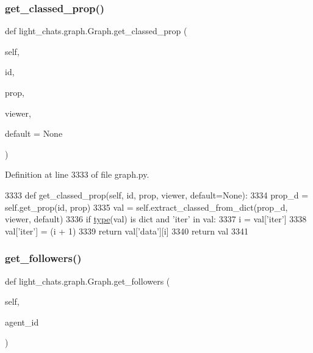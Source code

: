 \subsubsection{\texorpdfstring{get\+\_\+classed\+\_\+prop()}{get\_classed\_prop()}}
{\footnotesize\ttfamily def light\+\_\+chats.\+graph.\+Graph.\+get\+\_\+classed\+\_\+prop (\begin{DoxyParamCaption}\item[{}]{self,  }\item[{}]{id,  }\item[{}]{prop,  }\item[{}]{viewer,  }\item[{}]{default = {\ttfamily None} }\end{DoxyParamCaption})}



Definition at line 3333 of file graph.\+py.


\begin{DoxyCode}
3333     \textcolor{keyword}{def }get\_classed\_prop(self, id, prop, viewer, default=None):
3334         prop\_d = self.get\_prop(id, prop)
3335         val = self.extract\_classed\_from\_dict(prop\_d, viewer, default)
3336         \textcolor{keywordflow}{if} \hyperlink{namespaceparlai_1_1agents_1_1tfidf__retriever_1_1build__tfidf_ad5dfae268e23f506da084a9efb72f619}{type}(val) \textcolor{keywordflow}{is} dict \textcolor{keywordflow}{and} \textcolor{stringliteral}{'iter'} \textcolor{keywordflow}{in} val:
3337             i = val[\textcolor{stringliteral}{'iter'}]
3338             val[\textcolor{stringliteral}{'iter'}] = (i + 1) %
3339             \textcolor{keywordflow}{return} val[\textcolor{stringliteral}{'data'}][i]
3340         \textcolor{keywordflow}{return} val
3341 
\end{DoxyCode}
\mbox{\label{classlight__chats_1_1graph_1_1Graph_add43b11ac4acd2b8db044599c492564a}} 
\subsubsection{\texorpdfstring{get\+\_\+followers()}{get\_followers()}}
{\footnotesize\ttfamily def light\+\_\+chats.\+graph.\+Graph.\+get\+\_\+followers (\begin{DoxyParamCaption}\item[{}]{self,  }\item[{}]{agent\+\_\+id }\end{DoxyParamCaption})}

